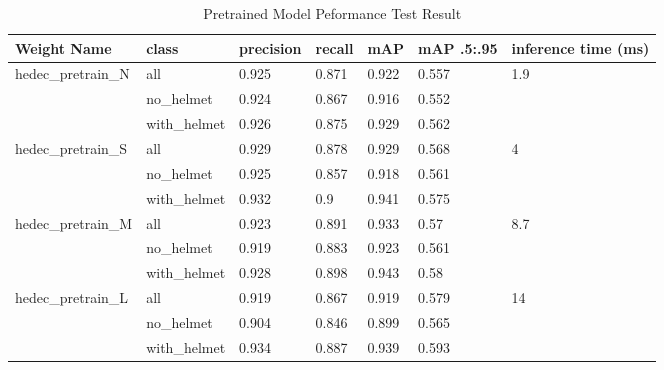 \begin{table}
  \centering
  \caption{Pretrained Model Peformance Test Result}
  \label{tb:pretrainbenchmarktest}
  \begin{tabular}{|l|l|l|l|l|l|l||} 
    \hline
    Weight Name                          & class        & precision & recall & mAP   & mAP .5:.95 & inference time (ms)    \\ 
    \hline
    \multirow{3}{*}{hedec\_pretrain\_N} & all          & 0.925     & 0.871  & 0.922 & 0.557      & \multirow{3}{*}{1.9}   \\
                                        & no\_helmet   & 0.924     & 0.867  & 0.916 & 0.552      &                        \\
                                        & with\_helmet & 0.926     & 0.875  & 0.929 & 0.562      &                        \\ 
    \hline
    \multirow{3}{*}{hedec\_pretrain\_S} & all          & 0.929     & 0.878  & 0.929 & 0.568      & \multirow{3}{*}{4}     \\
                                        & no\_helmet   & 0.925     & 0.857  & 0.918 & 0.561      &                        \\
                                        & with\_helmet & 0.932     & 0.9    & 0.941 & 0.575      &                        \\ 
    \hline
    \multirow{3}{*}{hedec\_pretrain\_M} & all          & 0.923     & 0.891  & 0.933 & 0.57       & \multirow{3}{*}{8.7}   \\
                                        & no\_helmet   & 0.919     & 0.883  & 0.923 & 0.561      &                        \\
                                        & with\_helmet & 0.928     & 0.898  & 0.943 & 0.58       &                        \\ 
    \hline
    \multirow{3}{*}{hedec\_pretrain\_L} & all          & 0.919     & 0.867  & 0.919 & 0.579      & \multirow{3}{*}{14}    \\
                                        & no\_helmet   & 0.904     & 0.846  & 0.899 & 0.565      &                        \\
                                        & with\_helmet & 0.934     & 0.887  & 0.939 & 0.593      &                        \\ 
    \hline
  \end{tabular}
\end{table}


